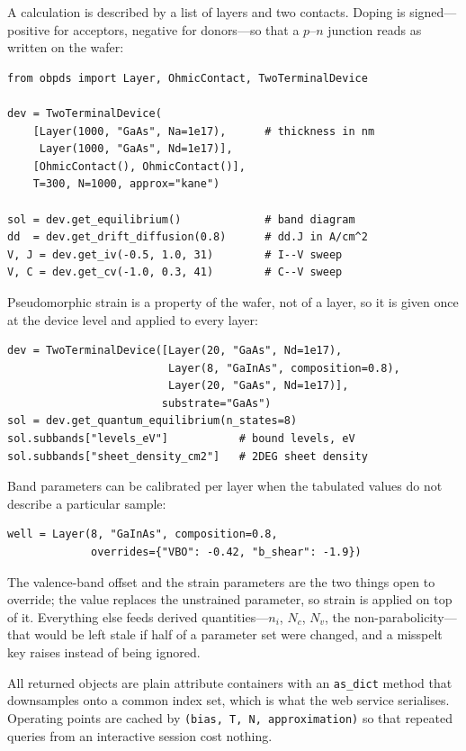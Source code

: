 \documentclass[preprint,12pt]{elsarticle}
\begin{document}
A calculation is described by a list of layers and two contacts. Doping is
signed---positive for acceptors, negative for donors---so that a $p$--$n$
junction reads as written on the wafer:

\begin{verbatim}
from obpds import Layer, OhmicContact, TwoTerminalDevice

dev = TwoTerminalDevice(
    [Layer(1000, "GaAs", Na=1e17),      # thickness in nm
     Layer(1000, "GaAs", Nd=1e17)],
    [OhmicContact(), OhmicContact()],
    T=300, N=1000, approx="kane")

sol = dev.get_equilibrium()             # band diagram
dd  = dev.get_drift_diffusion(0.8)      # dd.J in A/cm^2
V, J = dev.get_iv(-0.5, 1.0, 31)        # I--V sweep
V, C = dev.get_cv(-1.0, 0.3, 41)        # C--V sweep
\end{verbatim}

Pseudomorphic strain is a property of the wafer, not of a layer, so it is
given once at the device level and applied to every layer:

\begin{verbatim}
dev = TwoTerminalDevice([Layer(20, "GaAs", Nd=1e17),
                         Layer(8, "GaInAs", composition=0.8),
                         Layer(20, "GaAs", Nd=1e17)],
                        substrate="GaAs")
sol = dev.get_quantum_equilibrium(n_states=8)
sol.subbands["levels_eV"]           # bound levels, eV
sol.subbands["sheet_density_cm2"]   # 2DEG sheet density
\end{verbatim}

Band parameters can be calibrated per layer when the tabulated values do not
describe a particular sample:

\begin{verbatim}
well = Layer(8, "GaInAs", composition=0.8,
             overrides={"VBO": -0.42, "b_shear": -1.9})
\end{verbatim}

The valence-band offset and the strain parameters are the two things open to
override; the value replaces the unstrained parameter, so strain is applied on
top of it. Everything else feeds derived quantities---$n_i$, $N_c$, $N_v$, the
non-parabolicity---that would be left stale if half of a parameter set were
changed, and a misspelt key raises instead of being ignored.

All returned objects are plain attribute containers with an \texttt{as\_dict}
method that downsamples onto a common index set, which is what the web service
serialises. Operating points are cached by \texttt{(bias, T, N, approximation)}
so that repeated queries from an interactive session cost nothing.
\end{document}
